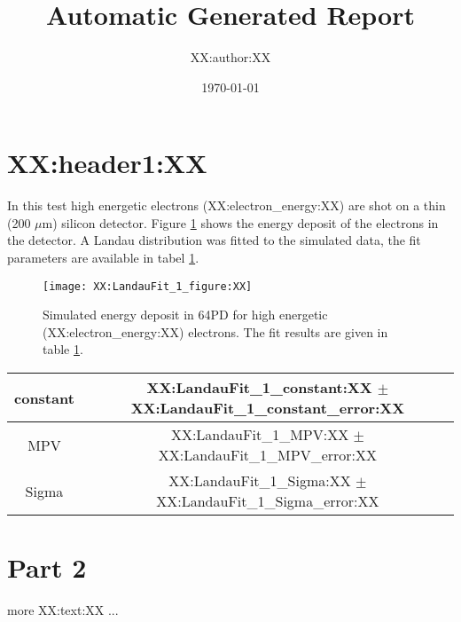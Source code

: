 \documentclass[pdftex, a4paper, 12pt,pointlessnumbers]{scrartcl} %
\title{Automatic Generated Report}
\author{XX:author:XX}
\date{\today}
\begin{document}
 
\maketitle


\tableofcontents

\newpage

\section{XX:header1:XX}

In this test high energetic electrons (XX:electron_energy:XX) are shot on a thin (200 $\mu$m) silicon detector. Figure \ref{fig:1} shows the energy deposit of the electrons in the detector. A Landau distribution was fitted to the simulated data, the fit parameters are available in tabel \ref{tab:fitresults}.

\begin{figure}[h]
\centering
	\texttt{[image: XX:LandauFit\_1\_figure:XX]}
	\caption[Energy deposit in 64PD]{Simulated energy deposit in 64PD for high energetic (XX:electron_energy:XX) electrons. The fit results are given in table \ref{tab:fitresults}.}
	\label{fig:1}
\end{figure}

\begin{table}[h]
	\centering
		\begin{tabular}{|c|c|}
		\hline
		constant & XX:LandauFit_1_constant:XX $\pm$ XX:LandauFit_1_constant_error:XX\\
		\hline
		MPV & XX:LandauFit_1_MPV:XX $\pm$ XX:LandauFit_1_MPV_error:XX\\
		\hline
		Sigma & XX:LandauFit_1_Sigma:XX $\pm$ XX:LandauFit_1_Sigma_error:XX\\
		\hline
		\end{tabular}
	\label{tab:fitresults}
\end{table}

\section{Part 2}

more XX:text:XX ...
\end{document}
